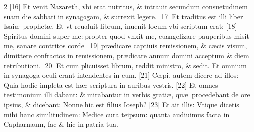 \documentclass[a5paper,10pt]{book}
\def\ae{æ}
\def\oe{œ}
\begin{document}
\begin{multicols*}{2}
[16] Et venit Nazareth, vbi erat nutritus, \& intrauit secundum consuetudinem suam die sabbati in synagogam, \& surrexit legere. [17] Et traditus est illi liber Isai\ae \ prophet\ae . Et vt reuoluit librum, inuenit locum vbi scriptum erat: [18] Spiritus domini super me: propter quod vnxit me, euangelizare pauperibus misit me, sanare contritos corde, [19] pr\ae dicare captiuis remissionem, \& c\ae cis visum, dimittere confractos in remissionem, pr\ae dicare annum domini acceptum \& diem retributioni. [20] Et cum plicuisset librum, reddit ministro, \& sedit. Et omnium in synagoga oculi erant intendentes in eum.
[21] C\oe pit autem dicere ad illos: Quia hodie impleta est h\ae c scriptura in auribus vestris. [22] Et omnes testimonium illi dabant: \& mirabantur in verbis grati\ae , qu\ae \ procedebant de ore ipsius, \& dicebant: Nonne hic est filius Ioseph? [23] Et ait illis: Vtique dicetis mihi hanc similitudinem: Medice cura teipsum: quanta audiuimus facta in Capharnaum, fac \& hic in patria tua.


\end{multicols*}
\end{document}

